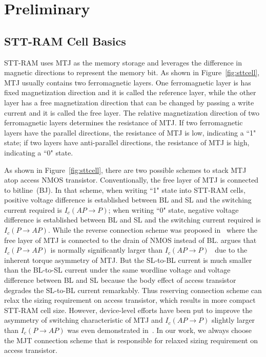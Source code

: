 \section{Preliminary} \label{sec:prelim}

\subsection{STT-RAM Cell Basics}
STT-RAM uses MTJ as the memory storage and leverages the difference in magnetic directions to represent the memory bit.  As shown in Figure~\ref{fig:sttcell}, MTJ usually contains two ferromagnetic layers.  One ferromagnetic layer is has fixed magnetization direction and it is called the reference layer, while the other layer has a free magnetization direction that can be changed by passing a write current and it is called the free layer. The relative magnetization direction of two ferromagnetic layers determines the resistance of MTJ.  If two ferromagnetic layers have the parallel directions, the resistance of MTJ is low, indicating a ``1" state; if two layers have anti-parallel directions, the resistance of MTJ is high, indicating a ``0" state.

As shown in Figure~\ref{fig:sttcell}, there are two possible schemes to stack MTJ atop access NMOS transistor. Conventionally, the free layer of MTJ is connected to bitline~(BJ). In that scheme, when writing ``1" state into STT-RAM cells, positive voltage difference is established between BL and SL and the switching current required is $I_{c}(AP\rightarrow P)$; when writing ``0" state, negative voltage difference is established between BL and SL and the switching current required is $I_{c}(P\rightarrow AP)$. While the reverse connection scheme was proposed in~\cite{STTRAM:Qualcomm09} where the free layer of MTJ is connected to the drain of NMOS instead of BL. \cite{STTRAM:Qualcomm09} argues that $I_{c}(P\rightarrow AP)$ is normally significantly larger than $I_{c}(AP\rightarrow P)$~\cite{STTRAM:APL05,STTRAM:PRB05} due to the inherent torque asymmetry of MTJ. But the SL-to-BL current is much smaller than the BL-to-SL current under the same wordline voltage and voltage difference between BL and SL because the body effect of access transistor degrades the SL-to-BL current remarkably. Thus reserving connection scheme can relax the sizing requirement on access transistor, which results in more compact STT-RAM cell size. However, device-level efforts have been put to improve the asymmetry of switching characteristic of MTJ and $I_{c}(AP\rightarrow P)$ slightly larger than $I_{c}(P\rightarrow AP)$ was even demonstrated in~\cite{STTRAM:Grandis07}. In our work, we always choose the MJT connection scheme that is responsible for relaxed sizing requirement on access transistor.

